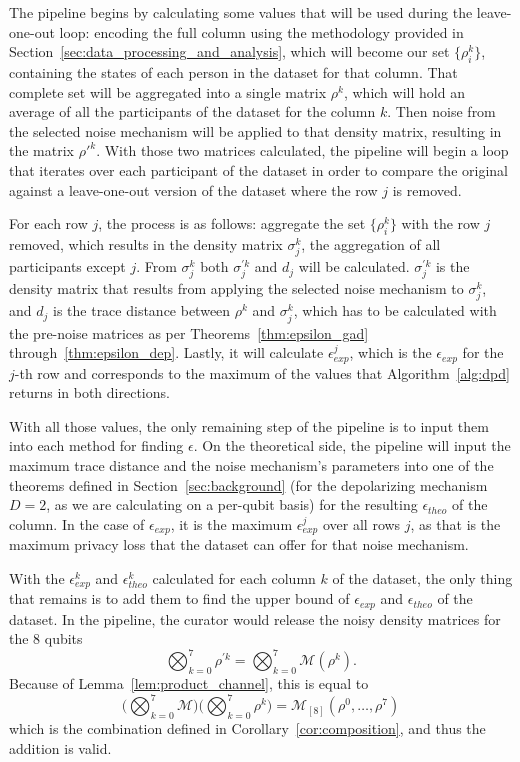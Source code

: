 \documentclass{ieeeaccess}
\begin{document}
The pipeline begins by calculating some values that will be used during the leave-one-out loop: encoding the full column using the methodology provided in Section~\ref{sec:data_processing_and_analysis}, which will become our set $\{\rho_i^{k}\}$, containing the states of each person in the dataset for that column. That complete set will be aggregated into a single matrix $\rho^{k}$, which will hold an average of all the participants of the dataset for the column $k$. Then noise from the selected noise mechanism will be applied to that density matrix, resulting in the matrix $\rho'^{k}$. With those two matrices calculated, the pipeline will begin a loop that iterates over each participant of the dataset in order to compare the original against a leave-one-out version of the dataset where the row $j$ is removed.

For each row $j$, the process is as follows: aggregate the set $\{\rho_i^{k}\}$ with the row $j$ removed, which results in the density matrix $\sigma_j^{k}$, the aggregation of all participants except $j$. From $\sigma_j^{k}$ both $\sigma_j^{\prime k}$ and $d_j$ will be calculated. $\sigma_j^{\prime k}$ is the density matrix that results from applying the selected noise mechanism to $\sigma_j^{k}$, and $d_j$ is the trace distance between $\rho^{k}$ and $\sigma_{j}^{k}$, which has to be calculated with the pre-noise matrices as per Theorems~\ref{thm:epsilon_gad} through~\ref{thm:epsilon_dep}. Lastly, it will calculate $\epsilon_{exp}^{j}$, which is the $\epsilon_{exp}$ for the $j$-th row and corresponds to the maximum of the values that Algorithm~\ref{alg:dpd} returns in both directions. 

With all those values, the only remaining step of the pipeline is to input them into each method for finding $\epsilon$. On the theoretical side, the pipeline will input the maximum trace distance and the noise mechanism's parameters into one of the theorems defined in Section~\ref{sec:background} (for the depolarizing mechanism $D=2$, as we are calculating on a per-qubit basis) for the resulting $\epsilon_{theo}$ of the column. In the case of $\epsilon_{exp}$, it is the maximum $\epsilon_{exp}^{j}$ over all rows $j$, as that is the maximum privacy loss that the dataset can offer for that noise mechanism.

With the $\epsilon_{exp}^{k}$ and $\epsilon_{theo}^{k}$ calculated for each column $k$ of the dataset, the only thing that remains is to add them to find the upper bound of $\epsilon_{exp}$ and $\epsilon_{theo}$ of the dataset. In the pipeline, the curator would release the noisy density matrices for the 8 qubits
\[
  \bigotimes_{k=0}^{7} \rho^{\prime k} = \bigotimes_{k=0}^{7} \mathcal{M}(\rho^{k}).
\]
Because of Lemma~\ref{lem:product_channel}, this is equal to
\[
  \Big(\bigotimes_{k=0}^{7} \mathcal{M}\Big)\Big(\bigotimes_{k=0}^{7} \rho^{k}\Big) = \mathcal{M}_{[8]}(\rho^{0}, \dots, \rho^{7})
\]
which is the combination defined in Corollary~\ref{cor:composition}, and thus the addition is valid.
 
\end{document}
